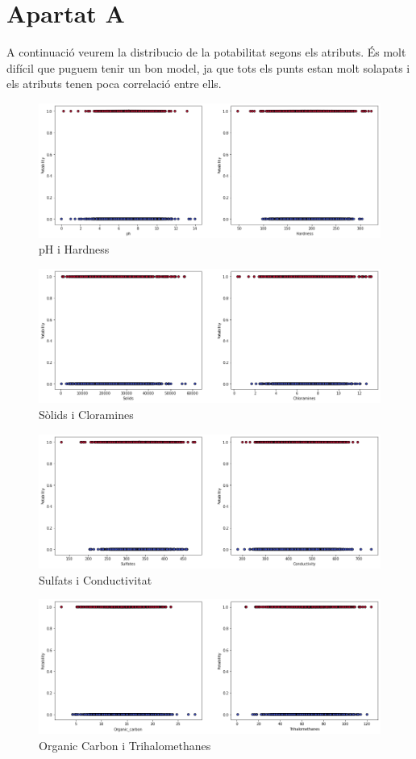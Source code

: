 \documentclass{article}
\begin{document}
	\section*{Apartat A}
	A continuació veurem la distribucio de la potabilitat segons els atributs. És molt difícil que puguem tenir un bon model, ja que tots els punts estan molt solapats i els atributs tenen poca correlació entre ells.\\
\begin{figure}[!h]
	\centering
	\includegraphics[width=0.7\linewidth]{../images/aa-ph}
	\caption*{pH i Hardness}
	\label{fig:aa-ph}
\end{figure}
\begin{figure}[!h]
	\centering
	\includegraphics[width=0.7\linewidth]{../images/aa-solids}
	\caption*{Sòlids i Cloramines}
	\label{fig:aa-ph}
\end{figure}
\begin{figure}[!h]
	\centering
	\includegraphics[width=0.7\linewidth]{../images/aa-sulfats}
	\caption*{Sulfats i Conductivitat}
	\label{fig:aa-ph}
\end{figure}
\clearpage
\begin{figure}[!h]
	\centering
	\includegraphics[width=0.7\linewidth]{../images/aa-organic-carbon}
	\caption*{Organic Carbon i Trihalomethanes}
	\label{fig:aa-ph}
\end{figure}
\end{document}

